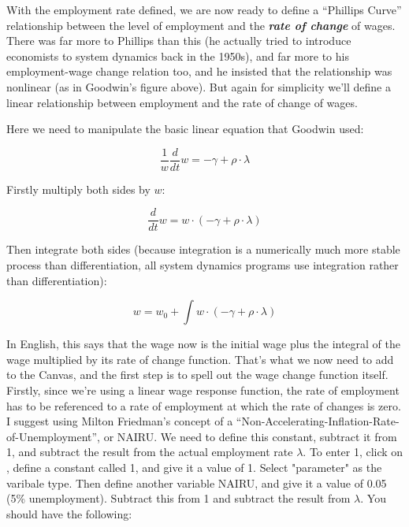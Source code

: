 With the employment rate defined, we are now ready to define a
``Phillips Curve'' relationship between the level of employment and the
{\em\bf rate of change} of wages. There was far more to Phillips than this (he
actually tried to introduce economists to system dynamics back in the
1950s), and far more to his employment-wage change relation too, and
he insisted that the relationship was nonlinear (as in Goodwin's
figure above). But again for simplicity we'll define a linear
relationship between employment and the rate of change of wages. 

Here we need to manipulate the basic linear equation that Goodwin used:

\begin{displaymath}
\frac1w\frac d{dt}w = -\gamma+\rho\cdot\lambda
\end{displaymath}

Firstly multiply both sides by $w$:

\begin{displaymath}
\frac d{dt}w = w\cdot(-\gamma+\rho\cdot\lambda)
\end{displaymath}

Then integrate both sides (because integration is a numerically much
more stable process than differentiation, all system dynamics programs
use integration rather than differentiation): 

\begin{displaymath}
w=w_0+\int w\cdot(-\gamma+\rho\cdot\lambda)
\end{displaymath}

In English, this says that the wage now is the initial wage plus the
integral of the wage multiplied by its rate of change function. That's
what we now need to add to the Canvas, and the first step is to spell
out the wage change function itself. Firstly, since we're using a
linear wage response function, the rate of employment has to be
referenced to a rate of employment at which the rate of changes is
zero.  I suggest using Milton Friedman's concept of a
``Non-Accelerating-Inflation-Rate-of-Unemployment'', or NAIRU. We need
to define this constant, subtract it from 1, and subtract the result
from the actual employment rate $\lambda$. To enter 1, click on , define a
constant called 1, and give it a value of 1. Select "parameter"
as the varibale type. Then define another variable
NAIRU, and give it a value of 0.05 (5\% unemployment). Subtract this
from 1 and subtract the result from $\lambda$. You should have the following:

